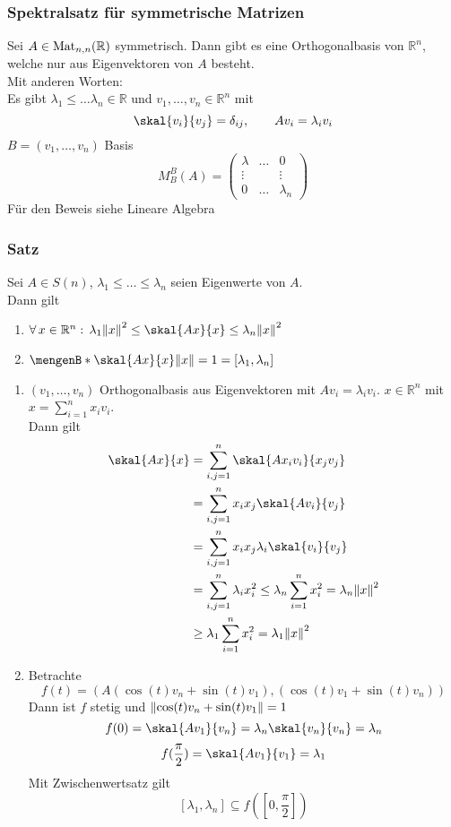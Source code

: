 \subsubsection{Spektralsatz für symmetrische Matrizen} %
\label{ssub:spektralsatz_fur_symmetrische_matrizen}
Sei $A \in \operatorname{Mat}_{n,n}(\mathbb{R})$ symmetrisch. Dann gibt es eine Orthogonalbasis von $\mathbb{R}^n$, welche nur aus Eigenvektoren von $A$  besteht. \\
Mit anderen Worten: \\
Es gibt $\lambda_1 \leq \dots \lambda_n \in \mathbb{R}$ und $v_1,\dots,v_n \in \mathbb{R}^n$ mit
\[
	\skal{v_i}{v_j}= \delta_{ij}, \qquad Av_i=\lambda_iv_i
\]
$B= (v_1, \dots, v_n)$ Basis
\[
	M_B^B(A)= \begin{pmatrix}
	\lambda & \dots & 0 \\ \vdots & & \vdots \\ 0 &\dots& \lambda_n
	\end{pmatrix}
\] Für den Beweis siehe Lineare Algebra
\subsubsection{Satz} %
\label{satz5.5}
Sei $A \in S(n)$, $\lambda_1 \leq \dots \leq \lambda_n$ seien Eigenwerte von $A$. \\
Dann gilt
\begin{enumerate}
	\item $\forall\, x \in \mathbb{R}^n:\, \lambda_1 \norm{x}^2 \leq \skal{Ax}{x} \leq \lambda_n \norm{x}^2$
	\item $\set[\skal{Ax}{x}]{\norm{x}=1}=[\lambda_1,\lambda_n]$
\end{enumerate}
\begin{enumerate}
	\item $(v_1,\dots,v_n)$ Orthogonalbasis aus Eigenvektoren mit $Av_i=\lambda_iv_i$. $x \in \mathbb{R}^n$ mit $x = \sum^{n}_{i=1}x_iv_i$. \\
	Dann gilt
	\begin{align*}
		\skal{Ax}{x}&= \sum^{n}_{i,j=1} \skal{Ax_iv_i}{x_jv_j} \\
		&= \sum^{n}_{i,j=1} x_ix_j \skal{Av_i}{v_j} \\
		&= \sum^{n}_{i,j=1} x_ix_j\lambda_i \skal{v_i}{v_j} \\
		&= \sum^{n}_{i,j=1} \lambda_ix_i^2 \leq \lambda_n \sum^{n}_{i=1}x_i^2 = \lambda_n \norm{x}^2 \\
		&\geq \lambda_1 \sum^{n}_{i=1}x_i^2 = \lambda_1 \norm{x}^2
	\end{align*}
	\item Betrachte
	\[
		f(t)=(A(\cos(t)v_n+\sin(t)v_1),(\cos(t)v_1+\sin(t)v_n))
	\] Dann ist $f$ stetig und $\norm{\cos(t)v_n+\sin(t)v_1}=1$
	\[
		f(0)=\skal{Av_1}{v_n}= \lambda_n \skal{v_n}{v_n}= \lambda_n
	\]
	\[
		f(\frac{\pi}{2})= \skal{Av_1}{v_1}=\lambda_1
	\]
	Mit Zwischenwertsatz gilt
	\[
		[\lambda_1,\lambda_n] \subseteq f\left(\left[0,\frac{\pi}{2}\right]\right)  
	\]
\end{enumerate}
\bewende
